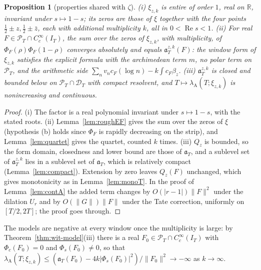 \documentclass[11pt]{amsart}
\newtheorem{proposition}[theorem]{Proposition}
\theoremstyle{definition}
\theoremstyle{remark}
\newcommand{\R}{\mathbb R}
\newcommand{\Rel}{\operatorname{Re}}
\newcommand{\PT}{\mathcal P_T}
\newcommand{\IT}{I_T}
\newcommand{\cF}{c_F}
\begin{document}
\begin{proposition}[properties shared with $\zeta$]\label{prop:quartetmodel}
\emph{(i)} $\xi_{z,k}$ is entire of order $1$, real on $\R$, invariant under $s\mapsto1-s$; its zeros are those of
$\xi$ together with the four points $\frac12\pm z,\frac12\pm\bar z$, each with additional multiplicity $k$, all in
$0<\Rel s<1$. \emph{(ii)} For real $F\in\PT\cap C_c^\infty(\IT)$, the sum over the zeros of $\xi_{z,k}$, with
multiplicity, of $\Phi_F(\rho)\Phi_F(1-\rho)$ converges absolutely and equals $\mathfrak a^{z,k}_T(F)$: the window
form of $\xi_{z,k}$ satisfies the explicit formula with the archimedean term $m$, no polar term on $\PT$, and the
arithmetic side $\sum_nv_n\cF(\log n)-k\int\cF\beta_z$. \emph{(iii)} $\mathfrak a^{z,k}_T$ is closed and bounded below on
$\PT\cap\mathcal D_T$ with compact resolvent, and $T\mapsto\lambda_{\mathrm A}(T;\xi_{z,k})$ is nonincreasing and
continuous.
\end{proposition}
\begin{proof}
(i) The factor is a real polynomial invariant under $s\mapsto1-s$, with the stated roots. (ii) Lemma~\ref{lem:roughEF}
gives the sum over the zeros of $\xi$ (hypothesis (b) holds since $\Phi_F$ is rapidly decreasing on the strip), and
Lemma~\ref{lem:quartet} gives the quartet, counted $k$ times. (iii) $Q_z$ is bounded, so the form domain, closedness
and lower bound are those of $\mathfrak a_T$, and a sublevel set of $\mathfrak a^{z,k}_T$ lies in a sublevel set of
$\mathfrak a_T$, which is relatively compact (Lemma~\ref{lem:compact}). Extension by zero leaves $Q_z(F)$ unchanged,
which gives monotonicity as in Lemma~\ref{lem:monoT}. In the proof of Lemma~\ref{lem:contA} the added term
changes by $O(|r-1|)\|F\|^2$ under the dilation $U_r$ and by $O(\|G\|)\|F\|$ under the Tate correction, uniformly
on $[T/2,2T]$; the proof goes through.
\end{proof}

The models are negative at every window once the multiplicity is large: by Theorem~\ref{thm:wit-model}(iii) there is a real $F_0\in\PT\cap C_c^\infty(\IT)$ with $\Phi_c(F_0)=0$ and $\Phi_s(F_0)\ne0$, so that $\lambda_{\mathrm A}(T;\xi_{z,k})\le(\mathfrak a_T(F_0)-4k|\Phi_s(F_0)|^2)/\|F_0\|^2\to-\infty$ as $k\to\infty$.
\end{document}
